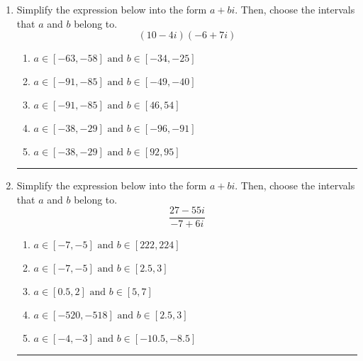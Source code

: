 \documentclass[14pt]{extbook}
\newcommand{\litem}[1]{\item#1\hspace*{-1cm}\rule{\textwidth}{0.4pt}}
\begin{document}
\begin{enumerate}
{\begin{enumerate}[label=\Alph*.]
\end{enumerate} }
\litem{
Simplify the expression below into the form $a+bi$. Then, choose the intervals that $a$ and $b$ belong to.\[ (10 - 4 i)(-6 + 7 i) \]\begin{enumerate}[label=\Alph*.]
\item \( a \in [-63, -58] \text{ and } b \in [-34, -25] \)
\item \( a \in [-91, -85] \text{ and } b \in [-49, -40] \)
\item \( a \in [-91, -85] \text{ and } b \in [46, 54] \)
\item \( a \in [-38, -29] \text{ and } b \in [-96, -91] \)
\item \( a \in [-38, -29] \text{ and } b \in [92, 95] \)

\end{enumerate} }
\litem{
Simplify the expression below into the form $a+bi$. Then, choose the intervals that $a$ and $b$ belong to.\[ \frac{27 - 55 i}{-7 + 6 i} \]\begin{enumerate}[label=\Alph*.]
\item \( a \in [-7, -5] \text{ and } b \in [222, 224] \)
\item \( a \in [-7, -5] \text{ and } b \in [2.5, 3] \)
\item \( a \in [0.5, 2] \text{ and } b \in [5, 7] \)
\item \( a \in [-520, -518] \text{ and } b \in [2.5, 3] \)
\item \( a \in [-4, -3] \text{ and } b \in [-10.5, -8.5] \)

\end{enumerate} }
\end{enumerate}
\end{document}

